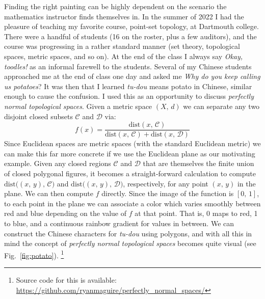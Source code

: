 \documentclass{article}
\begin{document}
    \par\hfill\par
    Finding the right painting can be highly dependent on the scenario the
    mathematics instructor finds themselves in. In the summer of 2022 I had the
    pleasure of teaching my favorite course, point-set topology, at Dartmouth
    college. There were a handful of students (16 on the roster, plus a few
    auditors), and the course was progressing in a rather standard manner
    (set theory, topological spaces, metric spaces, and so on). At the
    end of the class I always say \textit{Okay, toodles!} as an informal
    farewell to the students. Several of my Chinese students approached me at
    the end of class one day and asked me
    \textit{Why do you keep calling us potatoes}?
    It was then that I learned \textit{tu-dou} means potato in Chinese, similar
    enough to cause the confusion. I used this as an opportunity to discuss
    \textit{perfectly normal topological spaces}.
    Given a metric space $(X,\,d)$ we can separate any two disjoint closed
    subsets $\mathcal{C}$ and $\mathcal{D}$ via:
    \begin{equation}
        f(x)=
        \frac{\textrm{dist}(x,\,\mathcal{C})}
             {\textrm{dist}(x,\,\mathcal{C})+\textrm{dist}(x,\,\mathcal{D})}
    \end{equation}
    Since Euclidean spaces are metric spaces
    (with the standard Euclidean metric) we can make this far more concrete if
    we use the Euclidean plane as our motivating example. Given any closed
    regions $\mathcal{C}$ and $\mathcal{D}$ that are themselves the finite
    union of closed polygonal figures, it becomes a straight-forward
    calculation to compute
    $\textrm{dist}\big((x,\,y),\,\mathcal{C}\big)$ and
    $\textrm{dist}\big((x,\,y),\,\mathcal{D}\big)$, respectively, for any point
    $(x,\,y)$ in the plane. We can then compute $f$ directly. Since the image
    of the function is $[0,\,1]$, to each point in the plane we can associate
    a color which varies smoothly between red and blue depending on the value of
    $f$ at that point. That is, 0 maps to red, 1 to blue, and a continuous
    rainbow gradient for values in between. We can construct the Chinese
    characters for \textit{tu-dou} using polygons, and with all this in mind
    the concept of \textit{perfectly normal topological spaces} becomes quite
    visual (see Fig.~\ref{fig:potato}).
    \footnote{%
        Source code for this is available:
        \url{https://github.com/ryanmaguire/perfectly_normal_spaces/}
    }
\end{document}
